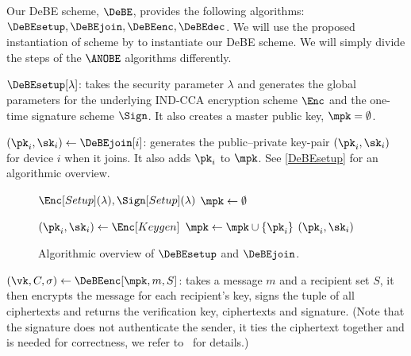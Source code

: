 \NewAlgorithm{\DeBEsetup}{\DeBE[Setup]}
\NewAlgorithm{\DeBEjoin}{\DeBE[Join]}
\NewAlgorithm{\DeBEenc}{\DeBE[Enc]}
\NewAlgorithm{\DeBEdec}{\DeBE[Dec]}

Our \ac{DeBE} scheme, \(\DeBE\), provides the following algorithms:
\(\DeBEsetup, \allowbreak \DeBEjoin, \allowbreak \DeBEenc, \allowbreak 
  \DeBEdec\).
We will use the proposed instantiation of  scheme by \textcite{ANOBE} 
to instantiate our \ac{DeBE} scheme.
We will simply divide the steps of the \(\ANOBE\) algorithms differently.


\(\DeBEsetup[\lambda]\): takes the security parameter \(\lambda\) and generates 
the global parameters for the underlying IND-CCA encryption scheme \(\Enc\) and 
the one-time signature scheme \(\Sign\).
It also creates a master public key, \(\mpk = \emptyset\).


\((\pk_i, \sk_i)\gets \DeBEjoin[i]\): generates the public--private key-pair 
\((\pk_i, \sk_i)\) for device \(i\) when it joins.
It also adds \(\pk_i\) to \(\mpk\).
See \cref{DeBEsetup} for an algorithmic overview.

\begin{figure}
  \begin{algorithmic}

    \Function{\DeBEsetup}{$\lambda$}
      \State $\Enc[Setup](\lambda), \Sign[Setup](\lambda)$
      \State $\mpk\gets \emptyset$
    \EndFunction

      \State $(\pk_i, \sk_i)\gets \Enc[Keygen]$
      \State $\mpk\gets \mpk\cup \{\pk_i\}$
      \State \Return $(\pk_i, \sk_i)$
    \EndFunction
  \end{algorithmic}
  \caption{\label{DeBEsetup}\label{DeBEjoin}%
    Algorithmic overview of \(\DeBEsetup\) and \(\DeBEjoin\).
  }
\end{figure}


\((\vk, C, \sigma)\gets \DeBEenc[\mpk, m, S]\):
takes a message \(m\) and a recipient set \(S\), it then encrypts the message 
for each recipient's key, signs the tuple of all ciphertexts and returns the 
verification key, ciphertexts and signature.
(Note that the signature does not authenticate the sender, it ties the 
ciphertext together and is needed for correctness, we refer to~\cite{ANOBE} for 
details.)

